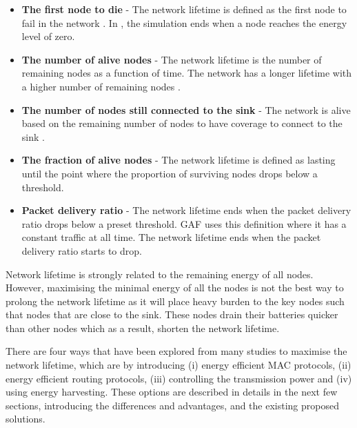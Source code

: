 \begin{itemize}
\item \textbf{The first node to die} - The network lifetime is defined as the first node to fail in the network \cite{maxmin, erapl}. In \cite{lifetimedef1}, the simulation ends when a node reaches the energy level of zero.

\item \textbf{The number of alive nodes} - The network lifetime is the number of remaining nodes as a function of time. The network has a longer lifetime with a higher number of remaining nodes \cite{lifetimedef2, smecn}.

\item \textbf{The number of nodes still connected to the sink} - The network is alive based on the remaining number of nodes to have coverage to connect to the sink \cite{smecn}.

\item \textbf{The fraction of alive nodes} - The network lifetime is defined as lasting until the point where the proportion of surviving nodes drops below a threshold.

\item \textbf{Packet delivery ratio} - The network lifetime ends when the packet delivery ratio drops below a preset threshold. GAF \cite{gaf} uses this definition where it has a constant traffic at all time. The network lifetime ends when the packet delivery ratio starts to drop.

\end{itemize}


Network lifetime is strongly related to the remaining energy of all nodes. However, maximising the minimal energy of all the nodes is not the best way to prolong the network lifetime as it will place heavy burden to the key nodes such that nodes that are close to the sink. These nodes drain their batteries quicker than other nodes which as a result, shorten the network lifetime.

There are four ways that have been explored from many studies to maximise the network lifetime, which are by introducing (i) energy efficient MAC protocols, (ii) energy efficient routing protocols, (iii) controlling the transmission power and (iv) using energy harvesting. These options are described in details in the next few sections, introducing the differences and advantages, and the existing proposed solutions.

